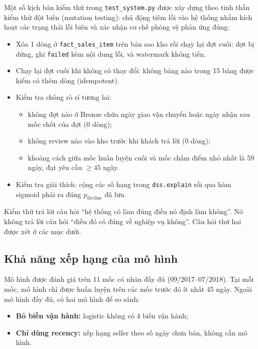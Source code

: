 Một số kịch bản kiểm thử trong \texttt{test\_system.py} được xây dựng theo tinh thần kiểm thử đột biến (mutation testing): chủ động tiêm lỗi vào hệ thống nhằm kích hoạt các trạng thái lỗi biên và xác nhận cơ chế phòng vệ phản ứng đúng:
\begin{itemize}
    \item Xóa 1 dòng ở \texttt{fact\_sales\_item} trên bản sao kho rồi chạy lại đợt cuối: đợt bị dừng, ghi \texttt{failed} kèm nội dung lỗi, và watermark không tiến.
    \item Chạy lại đợt cuối khi không có thay đổi: không bảng nào trong 15 bảng được kiểm có thêm dòng (idempotent).
    \item Kiểm tra chống rò rỉ tương lai:
    \begin{itemize}
        \item không đợt nào ở Bronze chứa ngày giao vận chuyển hoặc ngày nhận sau mốc chốt của đợt (0 dòng);
        \item không review nào vào kho trước khi khách trả lời (0 dòng);
        \item khoảng cách giữa mốc huấn luyện cuối và mốc chấm điểm nhỏ nhất là 59 ngày, đạt yêu cầu $\ge 45$ ngày.
    \end{itemize}
    \item Kiểm tra giải thích: cộng các số hạng trong \texttt{dss.explain} rồi qua hàm sigmoid phải ra đúng $p_{\text{decline}}$ đã lưu.
\end{itemize}
Kiểm thử trả lời câu hỏi ``hệ thống có làm đúng điều nó định làm không''. Nó không trả lời câu hỏi ``điều đó có đúng về nghiệp vụ không''. Câu hỏi thứ hai được xét ở các mục dưới.

\subsection{Khả năng xếp hạng của mô hình}
Mô hình được đánh giá trên 11 mốc có nhãn đầy đủ (09/2017--07/2018). Tại mỗi mốc, mô hình chỉ được huấn luyện trên các mốc trước đó ít nhất 45 ngày. Ngoài mô hình đầy đủ, có hai mô hình để so sánh:
\begin{itemize}
    \item \textbf{Bỏ biến vận hành:} logistic không có 4 biến vận hành;
    \item \textbf{Chỉ dùng recency:} xếp hạng seller theo số ngày chưa bán, không cần mô hình.
\end{itemize}

